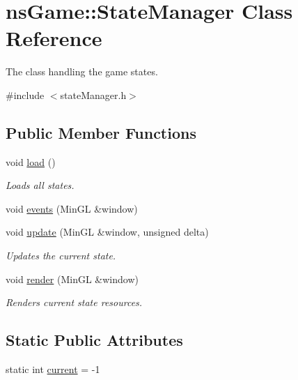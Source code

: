 \hypertarget{classns_game_1_1_state_manager}{}\section{ns\+Game\+:\+:State\+Manager Class Reference}
\label{classns_game_1_1_state_manager}


The class handling the game states.  




{\ttfamily \#include $<$state\+Manager.\+h$>$}

\subsection*{Public Member Functions}
\begin{DoxyCompactItemize}
\item 
void \hyperlink{classns_game_1_1_state_manager_a337170555d3a9a71cbc16c30a8364981}{load} ()
\begin{DoxyCompactList}\small\item\em Loads all states. \end{DoxyCompactList}\item 
void \hyperlink{classns_game_1_1_state_manager_acc7933a4b2160d8058789e24c0bd3cc6}{events} (Min\+GL \&window)
\item 
void \hyperlink{classns_game_1_1_state_manager_ab9c5e47745b79af657c08adcc8607475}{update} (Min\+GL \&window, unsigned delta)
\begin{DoxyCompactList}\small\item\em Updates the current state. \end{DoxyCompactList}\item 
void \hyperlink{classns_game_1_1_state_manager_a6f5b564dbd4e84529a125aca38f4339d}{render} (Min\+GL \&window)
\begin{DoxyCompactList}\small\item\em Renders current state resources. \end{DoxyCompactList}\end{DoxyCompactItemize}
\subsection*{Static Public Attributes}
\begin{DoxyCompactItemize}
\item 
static int \hyperlink{classns_game_1_1_state_manager_a434bcd70e388fe52aa9bef8e0e4175cd}{current} = -\/1
\end{DoxyCompactItemize}


